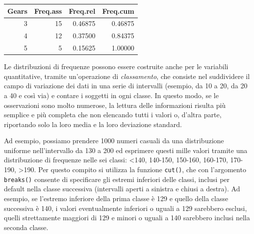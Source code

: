 \documentclass[
  12pt,
]{book}
\newenvironment{Shaded}{\begin{snugshade}}{\end{snugshade}}
\newcommand{\AttributeTok}[1]{\textcolor[rgb]{0.77,0.63,0.00}{#1}}
\newcommand{\DecValTok}[1]{\textcolor[rgb]{0.00,0.00,0.81}{#1}}
\newcommand{\FunctionTok}[1]{\textcolor[rgb]{0.00,0.00,0.00}{#1}}
\newcommand{\NormalTok}[1]{#1}
\newcommand{\OtherTok}[1]{\textcolor[rgb]{0.56,0.35,0.01}{#1}}
\newcommand{\SpecialCharTok}[1]{\textcolor[rgb]{0.00,0.00,0.00}{#1}}
\newcommand{\StringTok}[1]{\textcolor[rgb]{0.31,0.60,0.02}{#1}}
\begin{document}
\begin{Shaded}
\end{Shaded}

\begin{tabular}{r|r|r|r}
\hline
Gears & Freq.ass & Freq.rel & Freq.cum\\
\hline
3 & 15 & 0.46875 & 0.46875\\
\hline
4 & 12 & 0.37500 & 0.84375\\
\hline
5 & 5 & 0.15625 & 1.00000\\
\hline
\end{tabular}

Le distribuzioni di frequenze possono essere costruite anche per le variabili quantitative, tramite un'operazione di \emph{classamento}, che consiste nel suddividere il campo di variazione dei dati in una serie di intervalli (esempio, da 10 a 20, da 20 a 40 e così via) e contare i soggetti in ogni classe. In questo modo, se le osservazioni sono molto numerose, la lettura delle informazioni risulta più semplice e più completa che non elencando tutti i valori o, d'altra parte, riportando solo la loro media e la loro deviazione standard.

Ad esempio, possiamo prendere 1000 numeri casuali da una distribuzione uniforme nell'intervallo da 130 a 200 ed esprimere questi mille valori tramite una distribuzione di frequenze nelle sei classi: \textless140, 140-150, 150-160, 160-170, 170-190, \textgreater190. Per questo compito si utilizza la funzione \texttt{cut()}, che con l'argomento \texttt{breaks()} consente di specificare gli estremi inferiori delle classi, inclusi per default nella classe successiva (intervalli aperti a sinistra e chiusi a destra). Ad esempio, se l'estremo inferiore della prima classe è 129 e quello della classe successiva è 140, i valori eventualmente inferiori o uguali a 129 sarebbero esclusi, quelli strettamente maggiori di 129 e minori o uguali a 140 sarebbero inclusi nella seconda classe.
\end{document}
